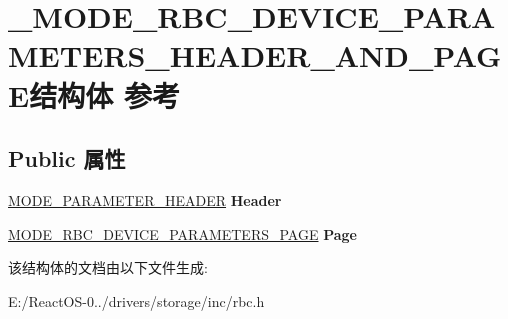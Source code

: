 \hypertarget{struct___m_o_d_e___r_b_c___d_e_v_i_c_e___p_a_r_a_m_e_t_e_r_s___h_e_a_d_e_r___a_n_d___p_a_g_e}{}\section{\+\_\+\+M\+O\+D\+E\+\_\+\+R\+B\+C\+\_\+\+D\+E\+V\+I\+C\+E\+\_\+\+P\+A\+R\+A\+M\+E\+T\+E\+R\+S\+\_\+\+H\+E\+A\+D\+E\+R\+\_\+\+A\+N\+D\+\_\+\+P\+A\+G\+E结构体 参考}
\label{struct___m_o_d_e___r_b_c___d_e_v_i_c_e___p_a_r_a_m_e_t_e_r_s___h_e_a_d_e_r___a_n_d___p_a_g_e}
\subsection*{Public 属性}
\begin{DoxyCompactItemize}
\item 
\mbox{\label{struct___m_o_d_e___r_b_c___d_e_v_i_c_e___p_a_r_a_m_e_t_e_r_s___h_e_a_d_e_r___a_n_d___p_a_g_e_ab939130ca7bc9692e055ef03b2259019}} 
\hyperlink{struct___m_o_d_e___p_a_r_a_m_e_t_e_r___h_e_a_d_e_r}{M\+O\+D\+E\+\_\+\+P\+A\+R\+A\+M\+E\+T\+E\+R\+\_\+\+H\+E\+A\+D\+ER} {\bfseries Header}
\item 
\mbox{\label{struct___m_o_d_e___r_b_c___d_e_v_i_c_e___p_a_r_a_m_e_t_e_r_s___h_e_a_d_e_r___a_n_d___p_a_g_e_ae0a47c9ef5f4b2fffb791909eca7334d}} 
\hyperlink{struct___m_o_d_e___r_b_c___d_e_v_i_c_e___p_a_r_a_m_e_t_e_r_s___p_a_g_e}{M\+O\+D\+E\+\_\+\+R\+B\+C\+\_\+\+D\+E\+V\+I\+C\+E\+\_\+\+P\+A\+R\+A\+M\+E\+T\+E\+R\+S\+\_\+\+P\+A\+GE} {\bfseries Page}
\end{DoxyCompactItemize}


该结构体的文档由以下文件生成\+:\begin{DoxyCompactItemize}
\item 
E\+:/\+React\+O\+S-\/0../drivers/storage/inc/rbc.\+h\end{DoxyCompactItemize}
